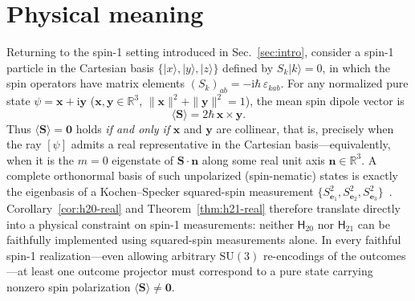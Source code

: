 \documentclass[twocolumn,aps,pra,floatfix,amsmath,amssymb,longbibliography]{revtex4-2}
\newenvironment{handrewrite}{\leavevmode\color{blue}}{}
\theoremstyle{definition}
\theoremstyle{remark}
\newcommand{\ii}{\mathrm{i}}
\newcommand{\R}{\mathbb R}
\newcommand{\Htwenty}{\mathsf H_{20}}
\newcommand{\Htwentyone}{\mathsf H_{21}}
\begin{document}
\section{Physical meaning}
\label{sec:physical}

\begin{handrewrite}
Returning to the spin-1 setting introduced in Sec.~\ref{sec:intro}, consider a
spin-1 particle in the Cartesian basis $\{|x\rangle,|y\rangle,|z\rangle\}$
defined by $S_k|k\rangle=0$, in which the spin operators have matrix elements
$(S_k)_{ab}=-\ii\hbar\,\varepsilon_{kab}$.  For any normalized pure state
$\psi=\mathbf x+\ii\mathbf y$ ($\mathbf x,\mathbf y\in\R^3$,
$\|\mathbf x\|^2+\|\mathbf y\|^2=1$), the mean spin dipole vector
is~\cite{ZiboldEtAl2016SpinNematic}
\begin{equation}
 \langle\mathbf S\rangle=2\hbar\,\mathbf x\times\mathbf y.
 \label{eq:spin-expectation}
\end{equation}
Thus $\langle\mathbf S\rangle=\mathbf 0$ holds \emph{if and only if} $\mathbf x$
and $\mathbf y$ are collinear, that is, precisely when the ray $[\psi]$ admits
a real representative in the Cartesian basis---equivalently, when it is the
$m=0$ eigenstate of $\mathbf S\cdot\mathbf n$ along some real unit axis
$\mathbf n\in\R^3$.  A complete orthonormal basis of such unpolarized
(spin-nematic) states is exactly the eigenbasis of a Kochen--Specker
squared-spin measurement $\{S_{\mathbf e_1}^2,S_{\mathbf e_2}^2,S_{\mathbf e_3}^2\}$~\cite{kochen1}.
Corollary~\ref{cor:h20-real} and Theorem~\ref{thm:h21-real} therefore translate
directly into a physical constraint on spin-1 measurements: neither $\Htwenty$
nor $\Htwentyone$ can be faithfully implemented using squared-spin measurements
alone.  In every faithful spin-1 realization---even allowing arbitrary
$\mathrm{SU}(3)$ re-encodings of the outcomes---at least one outcome projector
must correspond to a pure state carrying nonzero spin polarization
$\langle\mathbf S\rangle\ne\mathbf 0$.


\end{handrewrite}
\end{document}
